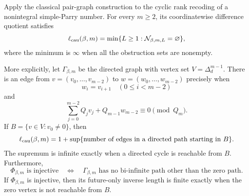 \begin{theorem}
\label{thm:simple-parry-causal-collision}
Apply the classical pair-graph construction to the cyclic rank recoding of a
nonintegral simple-Parry number.  For every $m\ge2$, its coordinatewise
difference quotient satisfies
\begin{equation}
\ell_{\rm cau}(\beta,m)
=\min\{L\ge1:\mathcal N_{\beta,m,L}=\varnothing\},
\label{eq:exact-causal-obstruction}
\end{equation}
where the minimum is $\infty$ when all the obstruction sets are nonempty.

More explicitly, let $\Gamma_{\beta,m}$ be the directed graph with vertex set
$V=\Delta_d^{m-1}$.  There is an edge from
$v=(v_0,\ldots,v_{m-2})$ to $w=(w_0,\ldots,w_{m-2})$ precisely when
\[
w_i=v_{i+1}\quad(0\le i<m-2)
\]
and
\begin{equation}
\sum_{j=0}^{m-2}Q_jv_j+Q_{m-1}w_{m-2}
\equiv0\pmod{Q_m}.
\label{eq:collision-graph-edge}
\end{equation}
If $B=\{v\in V:v_0\ne0\}$, then
\begin{equation}
\ell_{\rm cau}(\beta,m)
=1+\sup\{\text{number of edges in a directed path starting in }B\}.
\label{eq:collision-graph-longest-path}
\end{equation}
The supremum is infinite exactly when a directed cycle is reachable from
$B$.  Furthermore,
\begin{equation}
\Phi_{\beta,m}\text{ is injective}
\quad\Longleftrightarrow\quad
\Gamma_{\beta,m}\text{ has no bi-infinite path other than the zero path}.
\label{eq:collision-graph-injectivity}
\end{equation}
If $\Phi_{\beta,m}$ is injective, then its future-only inverse length is
finite exactly when the zero vertex is not reachable from $B$.
\end{theorem}

